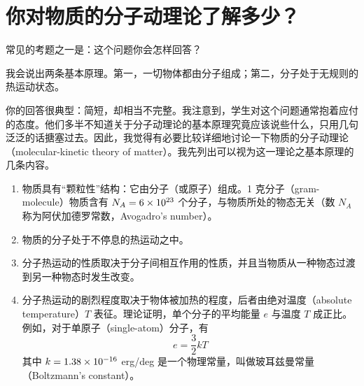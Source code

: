 
\chapter[你对物质的分子动理论了解多少？]{你对物质的分子动理论了解多少？\label{ch-18}}

\begin{dialogue}

\tchr 常见的考题之一是：这个问题你会怎样回答？

\stda 我会说出两条基本原理。第一，一切物体都由分子组成；第二，分子处于无规则的热运动状态。

\tchr 你的回答很典型：简短，却相当不完整。我注意到，学生对这个问题通常抱着应付的态度。他们多半不知道关于分子动理论的基本原理究竟应该说些什么，只用几句泛泛的话搪塞过去。因此，我觉得有必要比较详细地讨论一下物质的分子动理论（molecular-kinetic theory of matter）。我先列出可以视为这一理论之基本原理的几条内容。
\begin{enumerate}[label=\arabic*.,leftmargin=1cm]
\item 物质具有“颗粒性”结构：它由分子（或原子）组成。1 克分子（gram-molecule）物质含有 $N_{A} = \num{6d23}$ 个分子，与物质所处的物态无关（数 $N_{A}$ 称为阿伏加德罗常数，Avogadro's number）。
\item 物质的分子处于不停息的热运动之中。
\item 分子热运动的性质取决于分子间相互作用的性质，并且当物质从一种物态过渡到另一种物态时发生改变。
\item 分子热运动的剧烈程度取决于物体被加热的程度，后者由绝对温度（absolute temperature）$T$ 表征。理论证明，单个分子的平均能量 $e$ 与温度 $T$ 成正比。例如，对于单原子（single-atom）分子，有
\begin{equation}%
e = \frac{3}{2} kT
\label{eq-98}
\end{equation}
其中 $k= \num{1.38d-16}$ erg/deg 是一个物理常量，叫做玻耳兹曼常量（Boltzmann's constant）。


\end{enumerate}
\end{dialogue}
